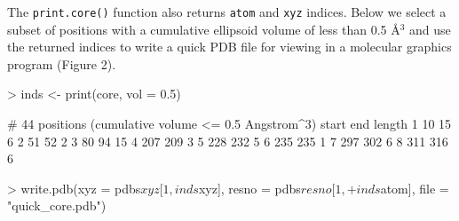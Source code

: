 \documentclass[a4paper]{article}
\begin{document}
The \texttt{print.core()} function also returns \texttt{atom} and \texttt{xyz} indices.  Below we select a subset of positions with a cumulative ellipsoid volume of less than 0.5 \AA $^3$ and use the returned indices to write a quick PDB file for viewing in a molecular graphics program (Figure 2).  
\begin{Schunk}
\begin{Sinput}
> inds <- print(core, vol = 0.5)
\end{Sinput}
\begin{Soutput}
# 44 positions (cumulative volume <= 0.5 Angstrom^3) 
  start end length
1    10  15      6
2    51  52      2
3    80  94     15
4   207 209      3
5   228 232      5
6   235 235      1
7   297 302      6
8   311 316      6
\end{Soutput}
\begin{Sinput}
> write.pdb(xyz = pdbs$xyz[1, inds$xyz], resno = pdbs$resno[1, 
+     inds$atom], file = "quick_core.pdb")
\end{Sinput}
\end{Schunk}
\end{document}
